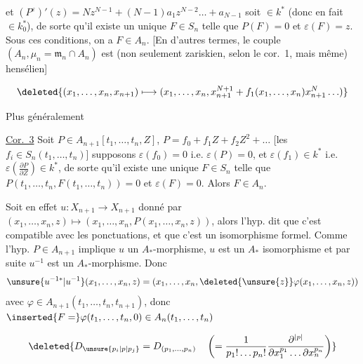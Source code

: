 et $(P^\varepsilon)'(z)=Nz^{N-1}+(N-1)a_1z^{N-2}\ldots+a_{N-1}$ soit $\in k^*$ (donc en fait $\in k_0^*$), de sorte qu'il existe un unique $F\in S_n$ telle que $P(F)=0$ et $\varepsilon(F)=z$. Sous ces conditions, on a $F\in A_n$. [En d'autres termes, le couple $(A_n,\mu_n=\mathfrak m_n\cap A_n)$ est (non seulement zariskien, selon le cor.~1, mais même) hensélien]

\[
\deleted{(x_1,\ldots,x_n,x_{n+1})\longmapsto (x_1,\ldots,x_n,x_{n+1}^{N+1}+f_1(x_1,\ldots,x_n)x_{n+1}^{N}\ldots)}
\]

Plus généralement

\uline{Cor.~3} Soit $P\in A_{n+1}[t_1,\ldots,t_n,Z]$, $P=f_0+f_1Z+f_2Z^2+\ldots$ [les $f_i\in S_n(t_1,\ldots,t_n)$] supposons $\varepsilon(f_0)=0$ i.e. $\varepsilon(P)=0$, et $\varepsilon(f_1)\in k^*$ i.e. $\varepsilon(\frac{\partial P}{\partial Z})\in k^*$, de sorte qu'il existe une unique $F\in S_n$ telle que $P(t_1,\ldots,t_n,F(t_1,\ldots,t_n))=0$ et $\varepsilon(F)=0$. Alors $F\in A_n$.

Soit en effet $u:X_{n+1}\to X_{n+1}$ donné par $(x_1,\ldots,x_n,z)\longmapsto(x_1,\ldots,x_n,P(x_1,\ldots,x_n,z))$, alors l'hyp. dit que c'est compatible avec les ponctuations, et que c'est un isomorphisme formel. Comme l'hyp. $P\in A_{n+1}$ implique $u$ un $A_*$-morphisme, $u$ est un $A_*$ isomorphisme et par suite $u^{-1}$ est un $A_*$-morphisme. Donc
\[
\unsure{u^{-1*}|u^{-1}}(x_1,\ldots,x_n,z)=(x_1,\ldots,x_n,\deleted{\unsure{z}}\varphi(x_1,\ldots,x_n,z))
\]
avec $\varphi\in A_{n+1}(t_1,\ldots,t_n,t_{n+1})$, donc $\inserted{F=}\varphi(t_1,\ldots,t_n,0)\in A_n(t_1,\ldots,t_n)$


\[
\deleted{D_{\unsure{p_i|p|p_j}}=D_{(p_1,\ldots,p_n)}\quad\left(=\frac{1}{p_1!\ldots p_n!}\frac{\partial^{|p|}}{\partial x_1^{p_1}\ldots\partial x_n^{p_n}}\right)}
\]
